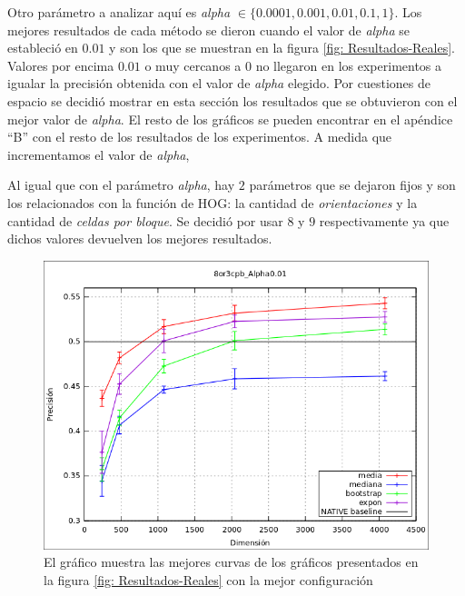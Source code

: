 	Otro parámetro a analizar aquí es \textit{alpha} $\in \{ 0.0001, 0.001, 0.01, 0.1, 1\}$. Los mejores resultados de cada método se dieron cuando el valor de \textit{alpha} se estableció en $0.01$ y son los que se muestran en la figura \ref{fig: Resultados-Reales}. Valores por encima $0.01$ o muy cercanos a 0 no llegaron en los experimentos a igualar la precisión obtenida con el valor de \textit{alpha} elegido. Por cuestiones de espacio se decidió mostrar en esta sección los resultados que se obtuvieron con el mejor valor de \textit{alpha}. El resto de los gráficos se pueden encontrar en el apéndice ``B'' con el resto de los resultados de los experimentos. A medida que incrementamos el valor de \textit{alpha}, 
	
	Al igual que con el parámetro \textit{alpha}, hay $2$ parámetros que se dejaron fijos y son los relacionados con la función de HOG: la cantidad de \textit{orientaciones} y la cantidad de \textit{celdas por bloque}. Se decidió por usar $8$ y $9$ respectivamente ya que dichos valores devuelven los mejores resultados. 
	
			\begin{figure}[htbp]
				\centering
				\centerline{
					\includegraphics[scale=0.7]{img/resultados/reales/comparativa_metodos.png}
				}
				\caption[Reales comparativa]{El gráfico muestra las mejores curvas de los gráficos presentados en la figura \ref{fig: Resultados-Reales} con la mejor configuración}
				\label{fig: Reales-Comparativa metodos}
			\end{figure}
	
